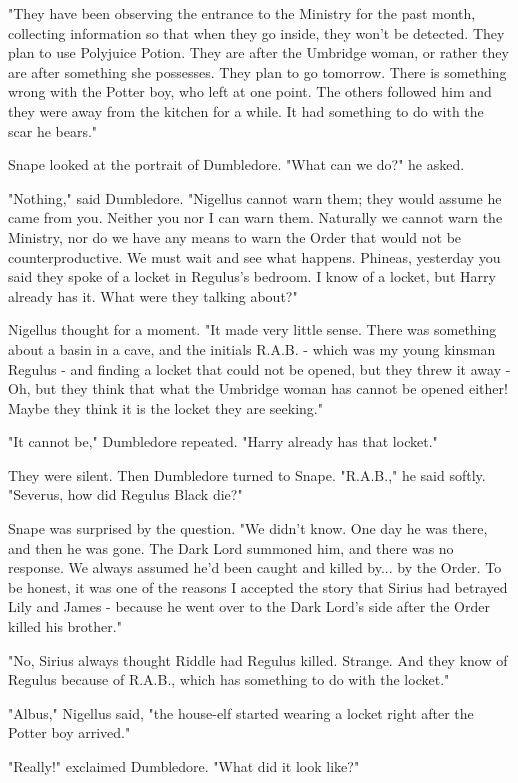 \documentclass[a4paper,11pt]{article}
\begin{document}
"They have been observing the entrance to the Ministry for the past month, collecting information so that when they go inside, they won't be detected. They plan to use Polyjuice Potion. They are after the Umbridge woman, or rather they are after something she possesses. They plan to go tomorrow. There is something wrong with the Potter boy, who left at one point. The others followed him and they were away from the kitchen for a while. It had something to do with the scar he bears."

Snape looked at the portrait of Dumbledore. "What can we do?" he asked.

"Nothing," said Dumbledore. "Nigellus cannot warn them; they would assume he came from you. Neither you nor I can warn them. Naturally we cannot warn the Ministry, nor do we have any means to warn the Order that would not be counterproductive. We must wait and see what happens. Phineas, yesterday you said they spoke of a locket in Regulus's bedroom. I know of a locket, but Harry already has it. What were they talking about?"

Nigellus thought for a moment. "It made very little sense. There was something about a basin in a cave, and the initials R.A.B. - which was my young kinsman Regulus - and finding a locket that could not be opened, but they threw it away - Oh, but they think that what the Umbridge woman has cannot be opened either! Maybe they think it is the locket they are seeking."

"It cannot be," Dumbledore repeated. "Harry already has that locket."

They were silent. Then Dumbledore turned to Snape. "R.A.B.," he said softly. "Severus, how did Regulus Black die?"

Snape was surprised by the question. "We didn't know. One day he was there, and then he was gone. The Dark Lord summoned him, and there was no response. We always assumed he'd been caught and killed by... by the Order. To be honest, it was one of the reasons I accepted the story that Sirius had betrayed Lily and James - because he went over to the Dark Lord's side after the Order killed his brother."

"No, Sirius always thought Riddle had Regulus killed. Strange. And they know of Regulus because of R.A.B., which has something to do with the locket."

"Albus," Nigellus said, "the house-elf started wearing a locket right after the Potter boy arrived."

"Really!" exclaimed Dumbledore. "What did it look like?"
\end{document}
